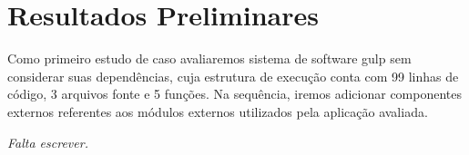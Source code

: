
%

\chapter{Resultados Preliminares}
\label{Chapter:Results}

Como primeiro estudo de caso avaliaremos sistema de software gulp sem considerar
suas dependências, cuja estrutura de execução conta com 99 linhas de código, 3
arquivos fonte e 5 funções. Na sequência, iremos adicionar componentes externos
referentes aos módulos externos utilizados pela aplicação avaliada.

\textit{Falta escrever.}
